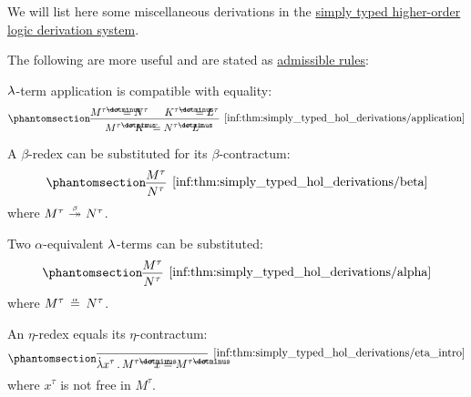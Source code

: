 \begin{proposition}\label{thm:simply_typed_hol_derivations}
  We will list here some miscellaneous derivations in the \hyperref[def:simply_typed_hol_proof_tree]{simply typed higher-order logic derivation system}.

  The following are more useful and are stated as  \hyperref[con:inference_rule_admissibility]{admissible rules}:
  \begin{thmenum}[series=thm:simply_typed_hol_derivations]
     \( {\mathrm \lambda} \)-term application is compatible with equality:
    \begin{equation*}\taglabel[\ensuremath{ \logic{HOL}_{=\logic{app}} }]{inf:thm:simply_typed_hol_derivations/application}
      \begin{prooftree}
        \hypo{ M^{\tau \synimplies \sigma} \syneq N^\tau }
        \hypo{ K^{\tau \synimplies \sigma} \syneq L^\tau }
        \infer2[\ref{inf:thm:simply_typed_hol_derivations/application}]{ M^{\tau \synimplies \sigma} K^\tau \syneq N^{\tau \synimplies \sigma} L^\tau }
      \end{prooftree}
    \end{equation*}

     A \( \beta \)-redex can be substituted for its \( \beta \)-contractum:
    \begin{equation*}\taglabel[\ensuremath{ \logic{HOL}_\beta }]{inf:thm:simply_typed_hol_derivations/beta}
      \begin{prooftree}
        \hypo{ M^\tau }
        \infer1[\ref{inf:thm:simply_typed_hol_derivations/beta}]{ N^\tau },
      \end{prooftree}
    \end{equation*}
    where \( M^\tau \bred* N^\tau \).

     Two \( \alpha \)-equivalent \( {\mathrm \lambda} \)-terms can be substituted:
    \begin{equation*}\taglabel[\ensuremath{ \logic{HOL}_\alpha }]{inf:thm:simply_typed_hol_derivations/alpha}
      \begin{prooftree}
        \hypo{ M^\tau }
        \infer1[\ref{inf:thm:simply_typed_hol_derivations/alpha}]{ N^\tau },
      \end{prooftree}
    \end{equation*}
    where \( M^\tau \aequiv N^\tau \).

     An \( \eta \)-redex equals its \( \eta \)-contractum:
    \begin{equation*}\taglabel[\ensuremath{ \logic{HOL}_{\eta+} }]{inf:thm:simply_typed_hol_derivations/eta_intro}
      \begin{prooftree}
        \infer0[\ref{inf:thm:simply_typed_hol_derivations/eta_intro}]{ \qabs {x^\tau} M^{\tau \synimplies \sigma} x \syneq M^{\tau \synimplies \sigma} },
      \end{prooftree}
    \end{equation*}
    where \( x^\tau \) is not free in \( M^\tau \).


\end{thmenum}
\end{proposition}
